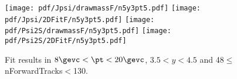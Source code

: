 \begin{figure}[H]
\begin{center}
\texttt{[image: pdf/Jpsi/drawmassF/n5y3pt5.pdf]}
\texttt{[image: pdf/Jpsi/2DFitF/n5y3pt5.pdf]}
\vspace*{-0.5cm}
\texttt{[image: pdf/Psi2S/drawmassF/n5y3pt5.pdf]}
\texttt{[image: pdf/Psi2S/2DFitF/n5y3pt5.pdf]}
\vspace*{-0.5cm}
\end{center}
\caption{Fit results in $8\gevc<\pt<20\gevc$, $3.5<y<4.5$ and 48$\leq$nForwardTracks$<$130.}
\label{Fitn5y3pt5}
\end{figure}
